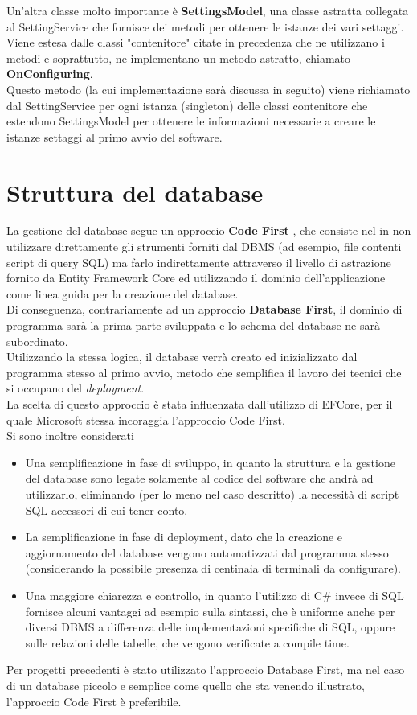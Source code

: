 \documentclass[\main/tesi.tex]{subfiles}
\begin{document}
Un'altra classe molto importante è \textbf{SettingsModel}, una classe astratta collegata al SettingService che fornisce dei metodi per ottenere le istanze dei vari settaggi.\\
Viene estesa dalle classi "contenitore" citate in precedenza che ne utilizzano i metodi e soprattutto, ne implementano un metodo astratto, chiamato \textbf{OnConfiguring}.\\
Questo metodo (la cui implementazione sarà discussa in seguito) viene richiamato dal SettingService per ogni istanza (singleton) delle classi contenitore che estendono SettingsModel per ottenere le informazioni necessarie a creare le istanze settaggi al primo avvio del software.

\section{Struttura del database}
La gestione del database segue un approccio \textbf{Code First} \cite{codefirst}, che consiste nel in non utilizzare direttamente gli strumenti forniti dal DBMS (ad esempio, file contenti script di query SQL) ma farlo indirettamente attraverso il livello di astrazione fornito da Entity Framework Core ed utilizzando il dominio dell'applicazione come linea guida per la creazione del database.\\
Di conseguenza, contrariamente ad un approccio \textbf{Database First}, il dominio di programma sarà la prima parte sviluppata e lo schema del database ne sarà subordinato.\\
Utilizzando la stessa logica, il database verrà creato ed inizializzato dal programma stesso al primo avvio, metodo che semplifica il lavoro dei tecnici che si occupano del \textit{deployment}.\\
La scelta di questo approccio è stata influenzata dall'utilizzo di EFCore, per il quale Microsoft stessa incoraggia l'approccio Code First.\\
Si sono inoltre considerati 
\begin{itemize}
    \item Una semplificazione in fase di sviluppo, in quanto la struttura e la gestione del database sono legate solamente al codice del software che andrà ad utilizzarlo, eliminando (per lo meno nel caso descritto) la necessità di script SQL accessori di cui tener conto.
    \item La semplificazione in fase di deployment, dato che la creazione e aggiornamento del database vengono automatizzati dal programma stesso (considerando la possibile presenza di centinaia di terminali da configurare).
    \item Una maggiore chiarezza e controllo, in quanto l'utilizzo di C\# invece di SQL fornisce alcuni vantaggi ad esempio sulla sintassi, che è uniforme anche per diversi DBMS a differenza delle implementazioni specifiche di SQL, oppure sulle relazioni delle tabelle, che vengono verificate a compile time.
\end{itemize} 
Per progetti precedenti è stato utilizzato l'approccio Database First, ma nel caso di un database piccolo e semplice come quello che sta venendo illustrato, l'approccio Code First è preferibile.\\
\end{document}
